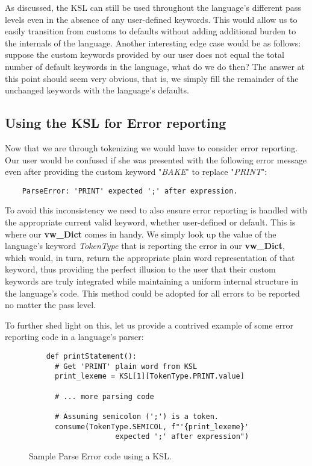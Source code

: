 \documentclass[a4paper,9pt]{article}
\begin{document}
As discussed, the KSL can still be used throughout the language's different pass levels even in the absence of any user-defined keywords. This would allow us to easily transition from customs to defaults without adding additional burden to the internals of the language. Another interesting edge case would be as follows: suppose the custom keywords provided by our user does not equal the total number of default keywords in the language, what do we do then? The answer at this point should seem very obvious, that is, we simply fill the remainder of the unchanged keywords with the language's defaults.

\subsection{Using the KSL for Error reporting}

Now that we are through tokenizing we would have to consider error reporting. Our user would be confused if she was presented with the following error message even after providing the custom keyword "\textit{BAKE}" to replace "\textit{PRINT}":

\begin{verbatim}
    ParseError: 'PRINT' expected ';' after expression.
\end{verbatim}

To avoid this inconsistency we need to also ensure error reporting is handled with the appropriate current valid keyword, whether user-defined or default. This is where our \textbf{vw\_Dict} comes in handy. We simply look up the value of the language's keyword \textit{TokenType} that is reporting the error in our \textbf{vw\_Dict}, which would, in turn, return the appropriate plain word representation of that keyword, thus providing the perfect illusion to the user that their custom keywords are truly integrated while maintaining a uniform internal structure in the language's code. This method could be adopted for all errors to be reported no matter the pass level.

To further shed light on this, let us provide a contrived example of some error reporting code in a language's parser:

\begin{figure}[ht]
  \begin{verbatim}
    def printStatement():
      # Get 'PRINT' plain word from KSL
      print_lexeme = KSL[1][TokenType.PRINT.value]

      # ... more parsing code

      # Assuming semicolon (';') is a token.
      consume(TokenType.SEMICOL, f"'{print_lexeme}' 
                    expected ';' after expression")
  \end{verbatim}
  \caption{Sample Parse Error code using a KSL.}
  \label{fig:parse-error-code}
\end{figure}
\end{document}
